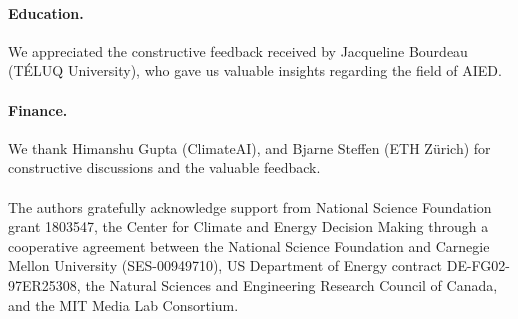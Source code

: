 \documentclass[11pt]{report}
\begin{document}
\paragraph*{Education.} We appreciated the constructive feedback received by Jacqueline Bourdeau (T\'{E}LUQ University), who gave us valuable insights regarding the field of AIED.

\paragraph*{Finance.} We thank Himanshu Gupta (ClimateAI), and Bjarne Steffen (ETH Z\"urich) for constructive discussions and the valuable feedback.

\paragraph*{}The authors gratefully acknowledge support from National Science Foundation grant 1803547, the Center for Climate and Energy Decision Making through a cooperative agreement between the National Science Foundation and Carnegie Mellon University (SES-00949710), US Department of Energy contract DE-FG02-97ER25308, the Natural Sciences and Engineering Research Council of Canada, and the MIT Media Lab Consortium.
\end{document}
